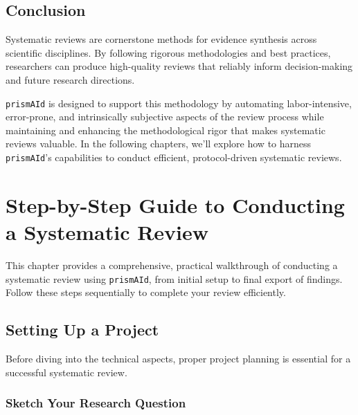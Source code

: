 \section{Conclusion}

Systematic reviews are cornerstone methods for evidence synthesis across scientific disciplines. By following rigorous methodologies and best practices, researchers can produce high-quality reviews that reliably inform decision-making and future research directions.


\texttt{prismAId} is designed to support this methodology by automating labor-intensive, error-prone, and intrinsically subjective aspects of the review process while maintaining and enhancing the methodological rigor that makes systematic reviews valuable. In the following chapters, we'll explore how to harness \texttt{prismAId}'s capabilities to conduct efficient, protocol-driven systematic reviews.


\chapter[Step-by-Step to a Systematic Review]{Step-by-Step Guide to Conducting a Systematic Review} \label{chap:walkthrough}

This chapter provides a comprehensive, practical walkthrough of conducting a systematic review using \texttt{prismAId}, from initial setup to final export of findings. Follow these steps sequentially to complete your review efficiently.

\section{Setting Up a Project}

Before diving into the technical aspects, proper project planning is essential for a successful systematic review.

\subsection{Sketch Your Research Question}

